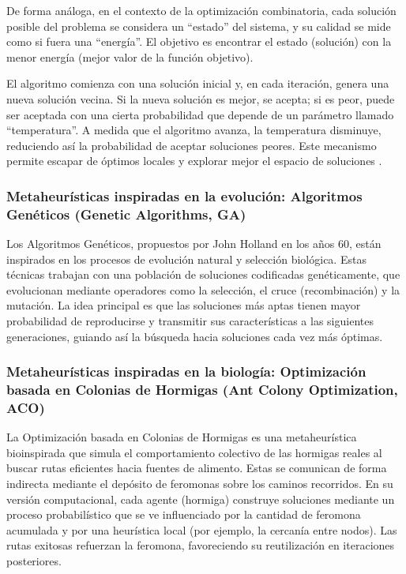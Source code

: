 \documentclass[12pt,titlepage,twoside,openright]{book}
\begin{document}
De forma análoga, en el contexto de la optimización combinatoria, cada solución posible del problema se considera un “estado” del sistema, y su calidad se mide como si fuera una “energía”. El objetivo es encontrar el estado (solución) con la menor energía (mejor valor de la función objetivo).

El algoritmo comienza con una solución inicial y, en cada iteración, genera una nueva solución vecina. Si la nueva solución es mejor, se acepta; si es peor, puede ser aceptada con una cierta probabilidad que depende de un parámetro llamado “temperatura”. A medida que el algoritmo avanza, la temperatura disminuye, reduciendo así la probabilidad de aceptar soluciones peores. Este mecanismo permite escapar de óptimos locales y explorar mejor el espacio de soluciones \citep{cobos2010}.

\subsubsection*{Metaheurísticas inspiradas en la evolución: Algoritmos Genéticos (Genetic Algorithms, GA)}
Los Algoritmos Genéticos, propuestos por John Holland en los años 60, están inspirados en los procesos de evolución natural y selección biológica. Estas técnicas trabajan con una población de soluciones codificadas genéticamente, que evolucionan mediante operadores como la selección, el cruce (recombinación) y la mutación. La idea principal es que las soluciones más aptas tienen mayor probabilidad de reproducirse y transmitir sus características a las siguientes generaciones, guiando así la búsqueda hacia soluciones cada vez más óptimas.

\subsubsection*{Metaheurísticas inspiradas en la biología: Optimización basada en Colonias de Hormigas (Ant Colony Optimization, ACO)}

La Optimización basada en Colonias de Hormigas es una metaheurística bioinspirada que simula el comportamiento colectivo de las hormigas reales al buscar rutas eficientes hacia fuentes de alimento. Estas se comunican de forma indirecta mediante el depósito de feromonas sobre los caminos recorridos. En su versión computacional, cada agente (hormiga) construye soluciones mediante un proceso probabilístico que se ve influenciado por la cantidad de feromona acumulada y por una heurística local (por ejemplo, la cercanía entre nodos). Las rutas exitosas refuerzan la feromona, favoreciendo su reutilización en iteraciones posteriores.
\end{document}
